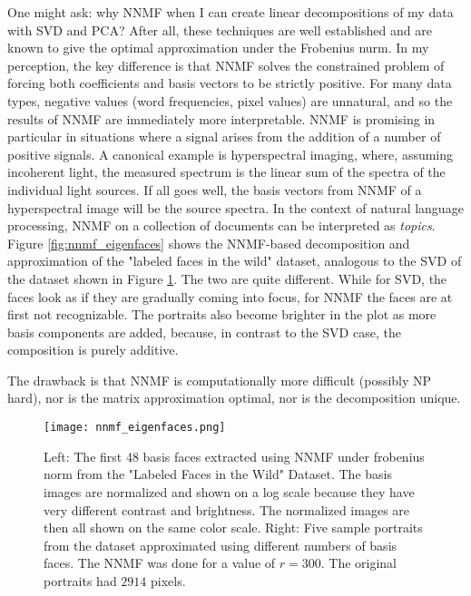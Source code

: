 One might ask: why NNMF when I can create linear decompositions of my data with SVD and PCA? After all, these techniques are well established and are known to give the optimal approximation under the Frobenius nurm. In my perception, the key difference is that NNMF solves the constrained problem of forcing both coefficients and basis vectors to be strictly positive. For many data types, negative values (word frequencies, pixel values) are unnatural, and so the results of NNMF are immediately more interpretable. NNMF is promising in particular in situations where a signal arises from the addition of a number of positive signals. A canonical example is hyperspectral imaging, where, assuming incoherent light, the measured spectrum is the linear sum of the spectra of the individual light sources. If all goes well, the basis vectors from NNMF of a hyperspectral image will be the source spectra. In the context of natural language processing, NNMF on a collection of documents can be interpreted as \textit{topics}. Figure \ref{fig:nnmf_eigenfaces} shows the NNMF-based decomposition and approximation of the "labeled faces in the wild" dataset, analogous to the SVD of the dataset shown in Figure \ref{fig:svd_eigenfaces}. The two are quite different. While for SVD, the faces look as if they are gradually coming into focus, for NNMF the faces are at first not recognizable. The portraits also become brighter in the plot as more basis components are added, because, in contrast to the SVD case, the composition is purely additive.  

The drawback is that NNMF is computationally more difficult (possibly NP hard), nor is the matrix approximation optimal, nor is the decomposition unique. 


\begin{figure}
\centering
    \texttt{[image: nnmf\_eigenfaces.png]}
    \caption{Left: The first 48 basis faces extracted using NNMF under frobenius norm from the "Labeled Faces in the Wild" Dataset. The basis images are normalized and shown on a log scale because they have very different contrast and brightness. The normalized images are then all shown on the same color scale. Right: Five sample portraits from the dataset approximated using different numbers of basis faces. The NNMF was done for a value of $r=300$. The original portraits had $2914$ pixels.}
    \label{fig:svd_eigenfaces}
\end{figure}